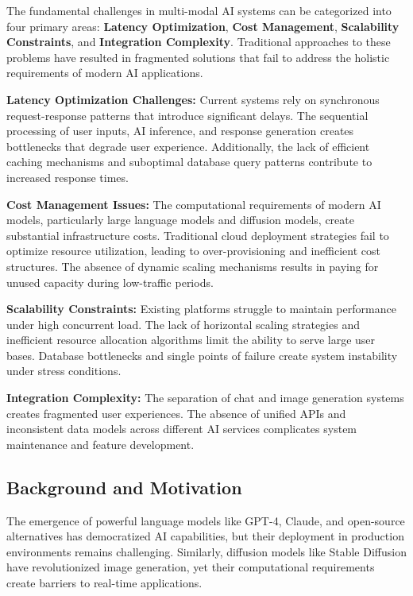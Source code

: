 \documentclass[conference]{IEEEtran}
\begin{document}
The fundamental challenges in multi-modal AI systems can be categorized into four primary areas: \textbf{Latency Optimization}, \textbf{Cost Management}, \textbf{Scalability Constraints}, and \textbf{Integration Complexity}. Traditional approaches to these problems have resulted in fragmented solutions that fail to address the holistic requirements of modern AI applications.

\textbf{Latency Optimization Challenges:} Current systems rely on synchronous request-response patterns that introduce significant delays. The sequential processing of user inputs, AI inference, and response generation creates bottlenecks that degrade user experience. Additionally, the lack of efficient caching mechanisms and suboptimal database query patterns contribute to increased response times.

\textbf{Cost Management Issues:} The computational requirements of modern AI models, particularly large language models and diffusion models, create substantial infrastructure costs. Traditional cloud deployment strategies fail to optimize resource utilization, leading to over-provisioning and inefficient cost structures. The absence of dynamic scaling mechanisms results in paying for unused capacity during low-traffic periods.

\textbf{Scalability Constraints:} Existing platforms struggle to maintain performance under high concurrent load. The lack of horizontal scaling strategies and inefficient resource allocation algorithms limit the ability to serve large user bases. Database bottlenecks and single points of failure create system instability under stress conditions.

\textbf{Integration Complexity:} The separation of chat and image generation systems creates fragmented user experiences. The absence of unified APIs and inconsistent data models across different AI services complicates system maintenance and feature development.

\subsection{Background and Motivation}
The emergence of powerful language models like GPT-4, Claude, and open-source alternatives has democratized AI capabilities, but their deployment in production environments remains challenging. Similarly, diffusion models like Stable Diffusion have revolutionized image generation, yet their computational requirements create barriers to real-time applications.
\end{document}
